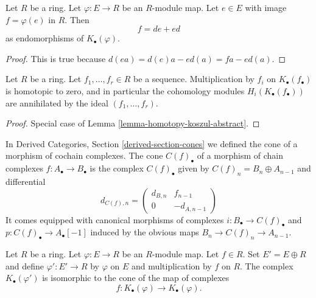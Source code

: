 \begin{lemma}
\label{lemma-homotopy-koszul-abstract}
Let $R$ be a ring. Let $\varphi : E \to R$ be an $R$-module map.
Let $e \in E$ with image $f = \varphi(e)$ in $R$. Then
$$
f = de + ed
$$
as endomorphisms of $K_\bullet(\varphi)$.
\end{lemma}

\begin{proof}
This is true because $d(ea) = d(e)a - ed(a) = fa - ed(a)$.
\end{proof}

\begin{lemma}
\label{lemma-homotopy-koszul}
Let $R$ be a ring. Let $f_1, \ldots, f_r \in R$ be a sequence.
Multiplication by $f_i$ on $K_\bullet(f_\bullet)$ is homotopic to
zero, and in particular the cohomology modules $H_i(K_\bullet(f_\bullet))$
are annihilated by the ideal $(f_1, \ldots, f_r)$.
\end{lemma}

\begin{proof}
Special case of
Lemma \ref{lemma-homotopy-koszul-abstract}.
\end{proof}

\noindent
In
Derived Categories, Section \ref{derived-section-cones}
we defined the cone of a morphism of cochain complexes.
The cone $C(f)_\bullet$ of a morphism of chain complexes
$f : A_\bullet \to B_\bullet$ is the complex $C(f)_\bullet$ given by
$C(f)_n = B_n \oplus A_{n - 1}$ and differential
\begin{equation}
\label{equation-differential-cone}
d_{C(f), n} =
\left(
\begin{matrix}
d_{B, n} & f_{n - 1} \\
0 & -d_{A, n - 1}
\end{matrix}
\right)
\end{equation}
It comes equipped with canonical morphisms of complexes
$i : B_\bullet \to C(f)_\bullet$ and
$p : C(f)_\bullet \to A_\bullet[-1]$
induced by the obvious maps $B_n \to C(f)_n \to A_{n - 1}$.

\begin{lemma}
\label{lemma-cone-koszul-abstract}
Let $R$ be a ring. Let $\varphi : E \to R$ be an $R$-module map.
Let $f \in R$. Set $E' = E \oplus R$ and define $\varphi' : E' \to R$
by $\varphi$ on $E$ and multiplication by $f$ on $R$.
The complex $K_\bullet(\varphi')$ is isomorphic to the
cone of the map of complexes
$$
f :
K_\bullet(\varphi)
\longrightarrow
K_\bullet(\varphi).
$$
\end{lemma}

